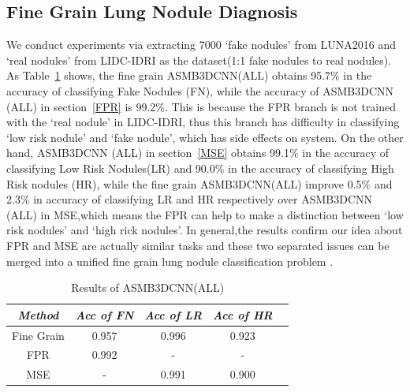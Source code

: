 \documentclass[runningheads]{llncs}
\begin{document}
\subsection{Fine Grain Lung Nodule Diagnosis}
We conduct experiments via extracting 7000 `fake nodules' from LUNA2016 and `real nodules' from LIDC-IDRI as the dataset(1:1 fake nodules to real nodules).
As Table~\ref{tab6} shows, the fine grain ASMB3DCNN(ALL) obtains 95.7\% in the accuracy of classifying Fake Nodules (FN), while the accuracy of ASMB3DCNN (ALL) in section~\ref{FPR} is 99.2\%. This is because the FPR branch is not trained with the `real nodule' in LIDC-IDRI, thus this branch has difficulty in classifying `low risk nodule' and `fake nodule', which has side effects on system.
On the other hand, ASMB3DCNN (ALL) in section~\ref{MSE} obtains 99.1\% in the accuracy of classifying Low Risk Nodules(LR) and 90.0\% in the accuracy of classifying High Risk nodules (HR), while the fine grain ASMB3DCNN(ALL) improve 0.5\% and 2.3\% in accuracy of classifying LR and HR respectively over ASMB3DCNN (ALL) in MSE,which means the FPR can help to make a distinction between `low risk nodules' and `high rick nodules'.
In general,the results confirm our idea about FPR and MSE are actually similar tasks and these two separated issues can be merged into a unified fine grain lung nodule classification problem .

\begin{table}[htb]
\vspace{-0.5cm}
\caption{Results of ASMB3DCNN(ALL)}
\vspace{-0.5cm}
\begin{center}
\begin{tabular}{|c|c|c|c|c|}
\hline
\textbf{\textit{Method}}& \textbf{\textit{Acc of FN}}& \textbf{\textit{Acc of LR}}& \textbf{\textit{Acc of HR}}  \\
\hline
Fine Grain & 0.957 & 0.996 & 0.923\\
FPR  & 0.992 & - & -\\
MSE & - & 0.991 &0.900 \\
\hline
\end{tabular}
\vspace{-0.5cm}
\label{tab6}
\end{center}
\vspace{-0.5cm}
\end{table}
\end{document}
